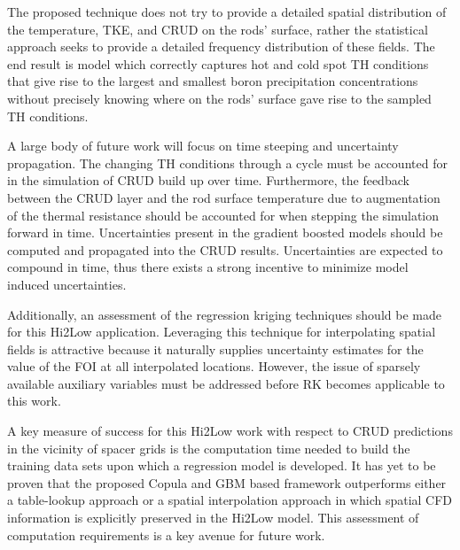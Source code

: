 
The proposed technique does not try to provide a detailed spatial distribution
of the temperature, TKE, and CRUD on the rods' surface, rather the
statistical approach seeks to provide a detailed frequency distribution
of these fields.  The end result is model which correctly captures hot and cold
spot TH conditions that give rise to the largest and smallest boron
precipitation concentrations without precisely knowing where on the rods'
surface gave rise to the sampled TH conditions.

A large body of future work will focus on time steeping and uncertainty propagation.
The changing TH conditions through a cycle must be accounted for in the simulation of CRUD build up over time.  Furthermore, the feedback between the CRUD layer and the rod surface temperature due to augmentation of the thermal resistance should be accounted for when stepping the simulation forward in time.
Uncertainties present in the gradient boosted models should be computed and
propagated into the CRUD results.   Uncertainties are expected to compound in time, thus there exists a strong incentive to minimize model induced uncertainties.

Additionally, an assessment of the regression kriging techniques should be made for this Hi2Low application.  Leveraging this technique for interpolating spatial fields is attractive because it naturally supplies uncertainty estimates for the value of the FOI at all interpolated locations.  However, the issue of sparsely available auxiliary variables must be addressed before RK becomes applicable to this work.

A key measure of success for this Hi2Low work with respect to  CRUD predictions
in the vicinity of spacer grids is the computation time needed to build the
training data sets upon which a regression model is developed.
It has yet to be proven that the proposed Copula and GBM based framework outperforms
either a table-lookup approach or a spatial interpolation approach in which
spatial CFD information is explicitly preserved in the Hi2Low model.  This assessment
of computation requirements is a key avenue for future work.